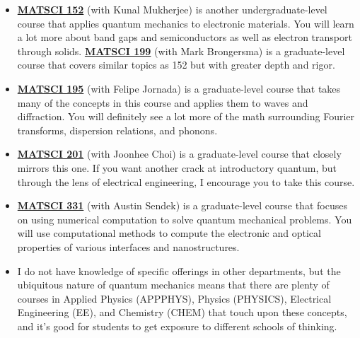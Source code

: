 \begin{itemize}
	\item \href{https://explorecourses.stanford.edu/search?q=matsci152}{\textbf{MATSCI 152}} (with Kunal Mukherjee) is another undergraduate-level course that applies quantum mechanics to electronic materials. 
	You will learn a lot more about band gaps and semiconductors as well as electron transport through solids. 
	\href{https://explorecourses.stanford.edu/search?q=matsci199}{\textbf{MATSCI 199}} (with Mark Brongersma) is a graduate-level course that covers similar topics as 152 but with greater depth and rigor.
	
	\item \href{https://explorecourses.stanford.edu/search?q=matsci195}{\textbf{MATSCI 195}} (with Felipe Jornada) is a graduate-level course that takes many of the concepts in this course and applies them to waves and diffraction. 
	You will definitely see a lot more of the math surrounding Fourier transforms, dispersion relations, and phonons.
	
	\item \href{https://explorecourses.stanford.edu/search?q=matsci201}{\textbf{MATSCI 201}} (with Joonhee Choi) is a graduate-level course that closely mirrors this one.
	If you want another crack at introductory quantum, but through the lens of electrical engineering, I encourage you to take this course.
	
	\item \href{https://explorecourses.stanford.edu/search?q=matsci331}{\textbf{MATSCI 331}} (with Austin Sendek) is a graduate-level course that focuses on using numerical computation to solve quantum mechanical problems. 
	You will use computational methods to compute the electronic and optical properties of various interfaces and nanostructures.
	
	\item I do not have knowledge of specific offerings in other departments, but the ubiquitous nature of quantum mechanics means that there are plenty of courses in Applied Physics (APPPHYS), Physics (PHYSICS), Electrical Engineering (EE), and Chemistry (CHEM) that touch upon these concepts, and it's good for students to get exposure to different schools of thinking.	
\end{itemize}

